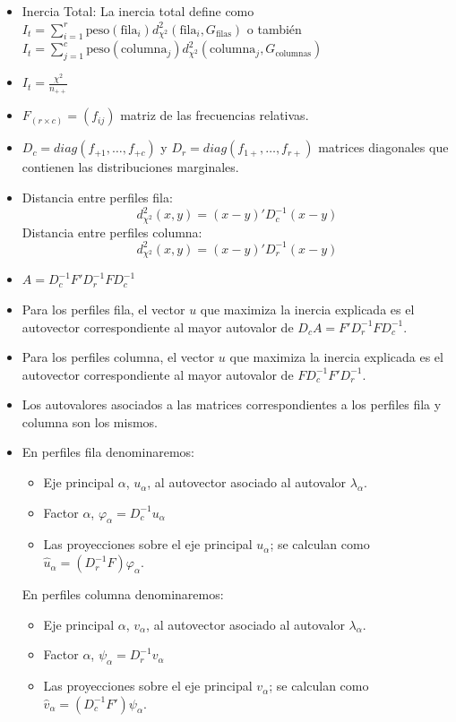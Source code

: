 \begin{itemize}
    \item Inercia Total: La inercia total define como $I_t=\sum_{i=1}^{r}\text{peso}(\text{fila}_i)d^2_{\chi^2}(\text{fila}_i,G_{\text{filas}})$ o también $I_t=\sum_{j=1}^{c}\text{peso}(\text{columna}_j)d^2_{\chi^2}(\text{columna}_j,G_{\text{columnas}})$
    \item $I_t=\frac{\chi^2}{n_{++}}$
    \item $F_{(r\times c)}=(f_{ij})$ matriz de las frecuencias relativas.
    \item $D_c=diag(f_{+1},\dots,f_{+c})$ y $D_r=diag(f_{1+},\dots,f_{r+})$ matrices diagonales que contienen las distribuciones marginales.
    \item Distancia entre perfiles fila: \[d^2_{\chi^2}(x,y)=(x-y)'D_c^{-1}(x-y)\] Distancia entre perfiles columna: \[d^2_{\chi^2}(x,y)=(x-y)'D_r^{-1}(x-y)\]
    \item $A=D_c^{-1}F'D_r^{-1}FD_c^{-1}$
    \item Para los perfiles fila, el vector $u$ que maximiza la inercia explicada es el autovector correspondiente al mayor autovalor de $D_cA=F'D_r^{-1}FD_c^{-1}$.
    \item Para los perfiles columna, el vector $u$ que maximiza la inercia explicada es el autovector correspondiente al mayor autovalor de $FD_c^{-1}F'D_r^{-1}$.
    \item Los autovalores asociados a las matrices correspondientes a los perfiles fila y columna son los mismos.
    \item En perfiles fila denominaremos:
          \begin{itemize}
              \item Eje principal $\alpha$, $u_\alpha$, al autovector asociado al autovalor $\lambda_\alpha$.
              \item Factor $\alpha$, $\varphi_\alpha=D_c^{-1}u_\alpha$
              \item Las proyecciones sobre el eje principal $u_\alpha$; se calculan como $\hat{u}_\alpha=(D_r^{-1}F)\varphi_\alpha$.
          \end{itemize}
          En perfiles columna denominaremos:
          \begin{itemize}
              \item Eje principal $\alpha$, $v_\alpha$, al autovector asociado al autovalor $\lambda_\alpha$.
              \item Factor $\alpha$, $\psi_\alpha=D_r^{-1}v_\alpha$
              \item Las proyecciones sobre el eje principal $v_\alpha$; se calculan como $\hat{v}_\alpha=(D_c^{-1}F')\psi_\alpha$.

\end{itemize}
\end{itemize}
